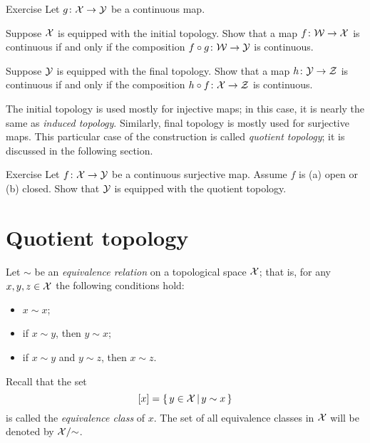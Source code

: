 \begin{thm}{Exercise}\label{ex:category-def-pull-push}
Let $g\colon\mathcal{X}\to\mathcal{Y}$ be a continuous map.

\begin{subthm}{}
Suppose $\mathcal{X}$ is equipped with the initial topology.
Show that a map $f\colon\mathcal{W}\to\mathcal{X}$ is continuous if and only if the composition $f\circ g\colon\mathcal{W}\to\mathcal{Y}$ is continuous.
\end{subthm}

\begin{subthm}{}
Suppose $\mathcal{Y}$ is equipped with the final topology.
Show that a map $h\colon\mathcal{Y}\to\mathcal{Z}$ is continuous if and only if the composition $h\circ f\colon\mathcal{X}\to\mathcal{Z}$ is continuous.
\end{subthm}

\end{thm}


The initial topology is used mostly for injective maps; in this case, it is nearly the same as \emph{induced topology}.
Similarly, final topology is mostly used for surjective maps.
This particular case of the construction is called \emph{quotient topology};
it is discussed in the following section.

\begin{thm}{Exercise}\label{ex:open-closed-pushforward}
Let $f\colon\mathcal{X}\to \mathcal{Y}$ be a continuous surjective map.
Assume $f$ is (a) open or (b) closed.
Show that $\mathcal{Y}$ is equipped with the quotient topology.
\end{thm}

\section{Quotient topology}

Let $\sim$ be an \emph{equivalence relation} on a topological space $\mathcal{X}$;
that is, for any $x,y,z\in\mathcal{X}$ the following conditions hold:
\begin{itemize}
 \item $x\sim x$;
 \item if $x\sim y$, then $y\sim x$;
 \item if $x\sim y$ and $y\sim z$, then $x\sim z$.
\end{itemize}

Recall that the set 
\[[x]=\left\{\,{y\in \mathcal{X}}\,\middle|\,{y\sim x}\,\right\}\]
is called the \emph{equivalence class} of $x$.
The set of all equivalence classes in $\mathcal{X}$ will be denoted by $\mathcal{X}/{\sim}$.

